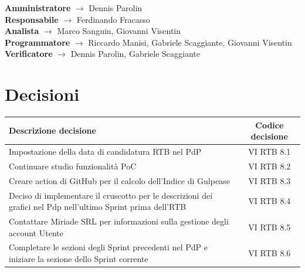 \documentclass[a4paper,12pt]{article}
\newcommand{\ignoreglossary}{}
\begin{document}
\begin{itemize}
    \begin{center}
        \textbf{Amministratore} $\rightarrow$ Dennis Parolin\\
        \textbf{Responsabile} $\rightarrow$ Ferdinando Fracasso\\
        \textbf{Analista} $\rightarrow$ Marco Sanguin, Giovanni Visentin\\
        \textbf{Programmatore} $\rightarrow$ Riccardo Manisi, Gabriele Scaggiante, Giovanni Visentin\\
        \textbf{Verificatore} $\rightarrow$ Dennis Parolin, Gabriele Scaggiante
    \end{center}
\end{itemize}
\pagebreak
\section{Decisioni}
\begin{center}
\small
\renewcommand{\arraystretch}{1.2} 
\begin{tabular}{|p{}|c|}
\hline
\rowcolor{gray!60} 
\textbf{Descrizione decisione} & \textbf{Codice decisione} \\
\hline
\rowcolor{white}
Impostazione della data di candidatura RTB nel PdP & VI \ignoreglossary{RTB} 8.1 \\
\hline
\rowcolor{gray!20}
Continuare studio funzionalità PoC & VI \ignoreglossary{RTB} 8.2\\
\hline
\rowcolor{white}
Creare action di GitHub per il calcolo dell'Indice di Gulpease & VI \ignoreglossary{RTB} 8.3\\
\hline
\rowcolor{gray!20}
Deciso di implementare il cruscotto per le descrizioni dei grafici nel Pdp nell'ultimo Sprint prima dell'RTB & VI \ignoreglossary{RTB} 8.4\\
\hline
\rowcolor{white}
Contattare Miriade SRL per informazioni sulla gestione degli account Utente & VI \ignoreglossary{RTB} 8.5\\
\hline
\rowcolor{gray!20}
Completare le sezioni degli Sprint precedenti nel PdP e iniziare la sezione dello Sprint corrente & VI \ignoreglossary{RTB} 8.6\\
\hline
\end{tabular}
\end{center}

\end{document}
